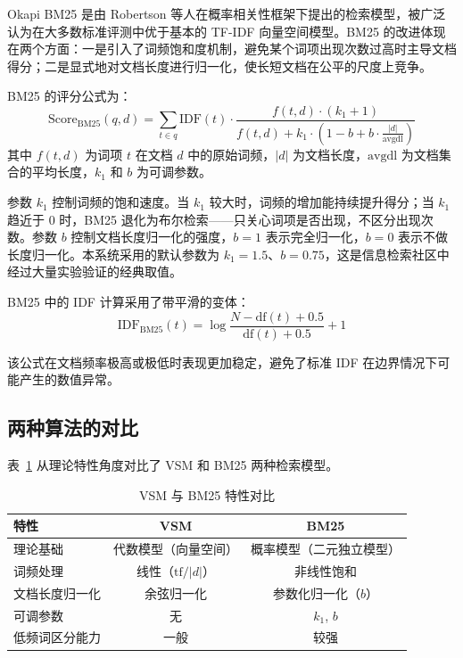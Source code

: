 \documentclass[12pt, a4paper]{ctexart}
\begin{document}
Okapi BM25 是由 Robertson 等人在概率相关性框架下提出的检索模型，被广泛认为在大多数标准评测中优于基本的 TF-IDF 向量空间模型。BM25 的改进体现在两个方面：一是引入了词频饱和度机制，避免某个词项出现次数过高时主导文档得分；二是显式地对文档长度进行归一化，使长短文档在公平的尺度上竞争。

BM25 的评分公式为：
\begin{equation}
    \text{Score}_{\text{BM25}}(q, d) = \sum_{t \in q} \text{IDF}(t) \cdot \frac{f(t, d) \cdot (k_1 + 1)}{f(t, d) + k_1 \cdot \left(1 - b + b \cdot \frac{|d|}{\text{avgdl}}\right)}
\end{equation}
其中 $f(t, d)$ 为词项 $t$ 在文档 $d$ 中的原始词频，$|d|$ 为文档长度，$\text{avgdl}$ 为文档集合的平均长度，$k_1$ 和 $b$ 为可调参数。

参数 $k_1$ 控制词频的饱和速度。当 $k_1$ 较大时，词频的增加能持续提升得分；当 $k_1$ 趋近于 0 时，BM25 退化为布尔检索——只关心词项是否出现，不区分出现次数。参数 $b$ 控制文档长度归一化的强度，$b = 1$ 表示完全归一化，$b = 0$ 表示不做长度归一化。本系统采用的默认参数为 $k_1 = 1.5$、$b = 0.75$，这是信息检索社区中经过大量实验验证的经典取值。

BM25 中的 IDF 计算采用了带平滑的变体：
\begin{equation}
    \text{IDF}_{\text{BM25}}(t) = \log \frac{N - \text{df}(t) + 0.5}{\text{df}(t) + 0.5} + 1
\end{equation}

该公式在文档频率极高或极低时表现更加稳定，避免了标准 IDF 在边界情况下可能产生的数值异常。

\subsection{两种算法的对比}

表~\ref{tab:algo_compare} 从理论特性角度对比了 VSM 和 BM25 两种检索模型。

\begin{table}[H]
\centering
\caption{VSM 与 BM25 特性对比}
\label{tab:algo_compare}
\begin{tabular}{lcc}
\toprule
\textbf{特性} & \textbf{VSM} & \textbf{BM25} \\
\midrule
理论基础 & 代数模型（向量空间） & 概率模型（二元独立模型） \\
词频处理 & 线性（$\text{tf} / |d|$） & 非线性饱和 \\
文档长度归一化 & 余弦归一化 & 参数化归一化（$b$） \\
可调参数 & 无 & $k_1$, $b$ \\
低频词区分能力 & 一般 & 较强 \\
\bottomrule
\end{tabular}
\end{table}
\end{document}
